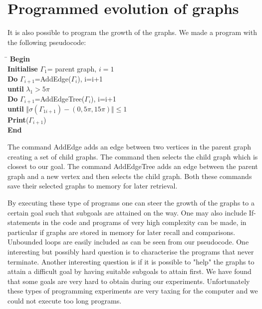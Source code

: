 \documentclass[a4paper]{article}
\begin{document}
\section{Programmed evolution of graphs}
It is also possible to program the growth of the graphs. We made a program with the following pseudocode:
\newline
\newline
\begin{tabbing}
\hspace{0.5cm} \=  \kill
\textbf{Begin}\\ 
\textbf{Initialise} $\Gamma_1$= parent graph, $i=1$\\  
\>  \textbf{Do} $\Gamma_{i+1}$=AddEdge($\Gamma_i$), i=i+1\\ \>\textbf{until} $\lambda_{1}>5\pi$\\
\>  \textbf{Do} $\Gamma_{i+1}$=AddEdgeTree($\Gamma_i$), i=i+1\\
\>  \textbf{until} $\Vert \sigma(\Gamma_{1i+1})-(0,5\pi,15\pi) \Vert \leq 1$\\
  \textbf{Print}($\Gamma_{i+1}$)\\
  \textbf{End}\\
\end{tabbing}  

The command AddEdge adds an edge between two vertices in the parent graph creating a set of child graphs. The command then selects the child graph which is closest to our goal. The command AddEdgeTree adds an edge between the parent graph and a new vertex and then selects the child graph. Both these commands save their selected graphs to memory for later retrieval.

By executing these type of programs one can steer the growth of the graphs to a certain goal such that subgoals are attained on the way. One may also include If-statements in the code and programs of very high complexity can be made, in particular if graphs are stored in memory for later recall and comparisons. Unbounded loops are easily included as can be seen from our pseudocode. One interesting but possibly hard question is to characterise the programs that never terminate. Another interesting question is if it is possible to "help" the graphs to attain a difficult goal by having suitable subgoals to attain first. We have found that some goals are very hard to obtain during our experiments. Unfortunately these types of programming experiments are very taxing for the computer and we could not execute too long programs.
\end{document}
